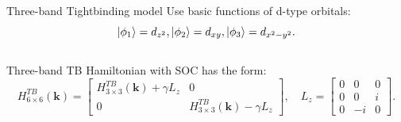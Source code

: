 \documentclass{beamer}
\begin{document}
\begin{frame}{Three-band Tightbinding model}
	Use basic functions of d-type orbitals: $$\ket{\phi_1} = d_{z^2}, \ket{\phi_2} = d_{xy}, \ket{\phi_3} = d_{x^2- y^2}.$$\\Three-band TB Hamiltonian with SOC has the form:
	\begin{equation*}
		H^{TB}_{6\times 6}(\textbf{k}) = \begin{bmatrix}
			H^{TB}_{3\times 3}(\textbf{k}) + \gamma L_z & 0\\ 0& H^{TB}_{3\times 3}(\textbf{k}) - \gamma L_z
		\end{bmatrix}, \quad L_z= \begin{bmatrix}
			0 & 0 & 0\\
			0 & 0 & i\\
			0 & -i& 0
		\end{bmatrix}.
	\end{equation*}
\end{frame}
\end{document}
